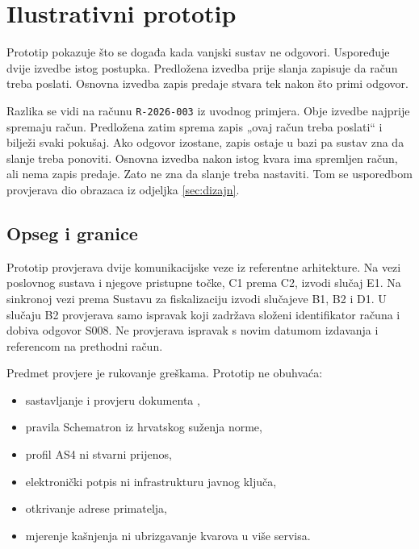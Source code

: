 \section{Ilustrativni prototip}
\label{ch:implementacija}

Prototip pokazuje što se događa kada vanjski sustav ne odgovori. Uspoređuje
dvije izvedbe istog postupka. Predložena izvedba prije slanja zapisuje da
račun treba poslati. Osnovna izvedba zapis predaje stvara tek nakon što
primi odgovor.

Razlika se vidi na računu \texttt{R-2026-003} iz uvodnog primjera. Obje
izvedbe najprije spremaju račun. Predložena zatim sprema zapis „ovaj račun
treba poslati“ i bilježi svaki pokušaj. Ako odgovor izostane, zapis ostaje
u bazi pa sustav zna da slanje treba ponoviti. Osnovna izvedba nakon istog
kvara ima spremljen račun, ali nema zapis predaje. Zato ne zna da slanje
treba nastaviti. Tom se usporedbom provjerava dio obrazaca iz
odjeljka \ref{sec:dizajn}.

\subsection{Opseg i granice}
\label{sec:opseg-prototipa}

Prototip provjerava dvije komunikacijske veze iz referentne arhitekture.
Na vezi poslovnog sustava i njegove pristupne točke, C1 prema C2, izvodi
slučaj E1. Na sinkronoj vezi prema Sustavu za fiskalizaciju izvodi slučajeve
B1, B2 i D1. U slučaju B2 provjerava samo ispravak koji zadržava složeni
identifikator računa i dobiva odgovor S008. Ne provjerava ispravak s novim
datumom izdavanja i referencom na prethodni račun.

Predmet provjere je rukovanje greškama. Prototip ne obuhvaća:

\begin{itemize}[nosep]
  \item sastavljanje i provjeru dokumenta
    ,
  \item pravila Schematron iz hrvatskog suženja norme,
  \item profil AS4 ni stvarni prijenos,
  \item elektronički potpis ni infrastrukturu javnog ključa,
  \item otkrivanje adrese primatelja,
  \item mjerenje kašnjenja ni ubrizgavanje kvarova u više servisa.
\end{itemize}


